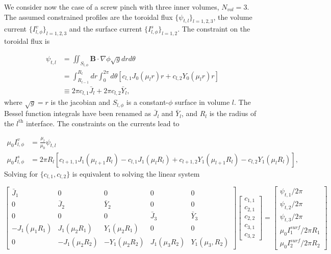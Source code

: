 We consider now the case of a screw pinch with three inner volumes, $N_{vol}=3$. The assumed constrained profiles are the toroidal flux $\{\psi_{t,l}\}_{l=1,2,3}$, the volume current $\{I^{v}_{l,\phi}\}_{l=1,2,3}$ and the surface current $\{I^{s}_{l,\phi}\}_{l=1,2}$. The constraint on the toroidal flux is

\begin{align}
	\psi_{t,l} &= \iint_{S_{l,\phi}} \mathbf{B}\cdot\nabla\phi \sqrt{g} dr d\theta\\
	&= \int_{R_{l-1}}^{R_l} dr \int_0^{2\pi} d\theta \left[ c_{l,1} J_0(\mu_l r) r + c_{l,2} Y_0(\mu_l r)r \right]\\
	&\equiv 2\pi c_{l,1} \bar{J}_l + 2\pi c_{l,2} \bar{Y}_l,
\end{align}
where $\sqrt{g}=r$ is the jacobian and $S_{l,\phi}$ is a constant-$\phi$ surface in volume $l$. The Bessel function integrals have been renamed as $\bar{J}_l$ and $\bar{Y}_l$, and $R_l$ is the radius of the $l^{\text{th}}$ interface. The constraints on the currents lead to

\begin{align}
	\mu_0I^{v}_{l,\phi} &= \frac{\mu_l}{\mu_0} \psi_{t,l}\\
	\mu_0I^{s}_{l,\phi} &= 2\pi R_l \left[ c_{l+1,1}J_1(\mu_{l+1}R_l) - c_{l,1}J_1(\mu_{l}R_l) + c_{l+1,2}Y_1(\mu_{l+1}R_l) -
	c_{l,2}Y_1(\mu_{l}R_l)\right],
\end{align}
Solving for $\{c_{l,1},c_{l,2}\}$ is equivalent to solving the linear system

\begin{equation}
	\begin{bmatrix}
		\bar{J}_{1} & 0 & 0 & 0 & 0 \\
		0 & \bar{J}_{2} & \bar{Y}_{2} & 0 & 0 \\
		0 & 0 & 0 & \bar{J}_{3} & \bar{Y}_{3} \\
		-J_1(\mu_1 R_1) & J_1(\mu_2 R_1) & Y_1(\mu_2 R_1) & 0 & 0 \\
		0 & -J_1(\mu_2 R_2) & -Y_1(\mu_2 R_2) & J_1(\mu_3 R_2) & Y_1( \mu_3, R_2)
	\end{bmatrix}
	\begin{bmatrix}
		c_{1,1}\\
		c_{2,1}\\
		c_{2,2}\\
		c_{3,1}\\
		c_{3,2}
	\end{bmatrix}
	=
	\begin{bmatrix}
		\psi_{t,1} / 2\pi\\
		\psi_{t,2} / 2\pi\\
		\psi_{t,3} / 2\pi\\
		\mu_0I^{surf}_1 / 2\pi R_1\\
		\mu_0I^{surf}_2 / 2\pi R_2
	\end{bmatrix} \label{eq.linear_system_constraint_SP}
\end{equation}


